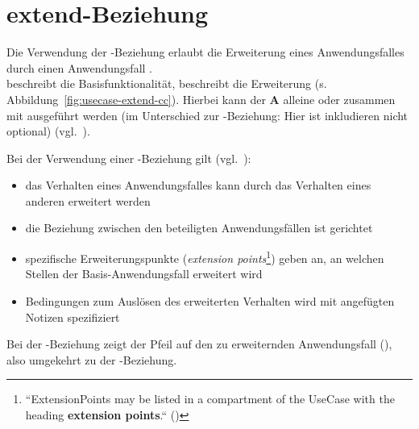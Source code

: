 \section{extend-Beziehung}

\begin{tcolorbox}[title=extend-Beziehung]
    Die Verwendung der -Beziehung erlaubt die Erweiterung eines Anwendungsfalles  durch einen Anwendungsfall .\\
     beschreibt die Basisfunktionalität,  beschreibt die Erweiterung (s. Abbildung~\ref{fig:usecase-extend-cc}).
    Hierbei kann der \textbf{A} alleine oder zusammen mit  ausgeführt werden (im Unterschied zur -Beziehung: Hier ist inkludieren nicht optional) (vgl.~\cite[54]{Bal05}).

    \noindent
    Bei der Verwendung einer -Beziehung gilt (vgl.~\cite[53]{Buh09}):

    \begin{itemize}
        \item das Verhalten eines Anwendungsfalles kann durch das Verhalten eines anderen erweitert werden
        \item die Beziehung zwischen den beteiligten Anwendungsfällen ist gerichtet
        \item spezifische Erweiterungspunkte (\textit{extension points}\footnote{
            ``ExtensionPoints may be listed in a compartment of the UseCase with the heading \textbf{extension points}.`` (\cite[642, Hervorhebung i.O.]{OMG17})
        }) geben an, an welchen Stellen der Basis-Anwendungsfall erweitert wird
        \item Bedingungen zum Auslösen des erweiterten Verhalten wird mit angefügten Notizen spezifiziert
    \end{itemize}

    \noindent
    Bei der -Beziehung zeigt der Pfeil auf den zu erweiternden Anwendungsfall (\cite[218]{Oes05}), also umgekehrt zu der -Beziehung.

\end{tcolorbox}

